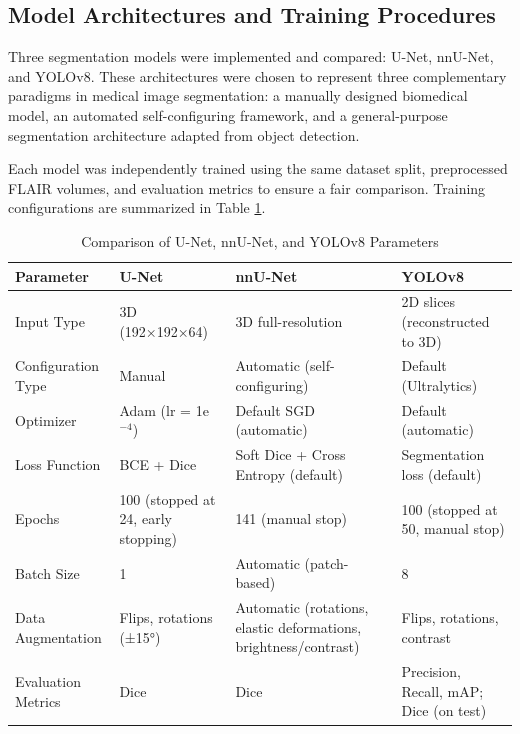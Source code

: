 \documentclass[12pt]{article}
\begin{document}
\subsection{Model Architectures and Training Procedures} \label{subsec:models}

Three segmentation models were implemented and compared: U-Net, nnU-Net, and YOLOv8. These architectures were chosen to represent three complementary paradigms in medical image segmentation: a manually designed biomedical model, an automated self-configuring framework, and a general-purpose segmentation architecture adapted from object detection.

Each model was independently trained using the same dataset split, preprocessed FLAIR volumes, and evaluation metrics to ensure a fair comparison. Training configurations are summarized in Table \ref{tab:model_comparison}.

\begin{table}[h]
\centering
\caption{Comparison of U-Net, nnU-Net, and YOLOv8 Parameters}
\label{tab:model_comparison}
\begin{tabular}{lll l}
\toprule
\textbf{Parameter} & \textbf{U-Net} & \textbf{nnU-Net} & \textbf{YOLOv8} \\
\midrule
Input Type & 3D (192×192×64) & 3D full-resolution & 2D slices (reconstructed to 3D) \\
Configuration Type & Manual & Automatic (self-configuring) & Default (Ultralytics) \\
Optimizer & Adam (lr = 1e$^{-4}$) & Default SGD (automatic) & Default (automatic) \\
Loss Function & BCE + Dice & Soft Dice + Cross Entropy (default) & Segmentation loss (default) \\
Epochs & 100 (stopped at 24, early stopping) & 141 (manual stop) & 100 (stopped at 50, manual stop) \\
Batch Size & 1 & Automatic (patch-based) & 8 \\
Data Augmentation & Flips, rotations (±15°) & Automatic (rotations, elastic deformations, brightness/contrast) & Flips, rotations, contrast \\
Evaluation Metrics & Dice & Dice & Precision, Recall, mAP; Dice (on test) \\
\bottomrule
\end{tabular}
\end{table}
\end{document}
